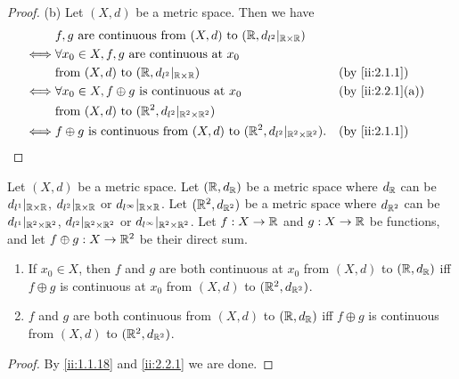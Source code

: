 \begin{proof}{(b)}
  Let \((X, d)\) be a metric space.
  Then we have
  \begin{align*}
         & f, g \text{ are continuous from } (X, d) \text{ to } (\R, d_{l^2}|_{\R \times \R})                                   \\
    \iff & \forall x_0 \in X, f, g \text{ are continuous at } x_0                                                               \\
         & \text{from } (X, d) \text{ to } (\R, d_{l^2}|_{\R \times \R})                                  &  & \by{ii:2.1.1}    \\
    \iff & \forall x_0 \in X, f \oplus g \text{ is continuous at } x_0                                    &  & \by{ii:2.2.1}[a] \\
         & \text{from } (X, d) \text{ to } (\R^2, d_{l^2}|_{\R^2 \times \R^2})                                                  \\
    \iff & f \oplus g \text{ is continuous from } (X, d) \text{ to } (\R^2, d_{l^2}|_{\R^2 \times \R^2}). &  & \by{ii:2.1.1}
  \end{align*}
\end{proof}

\begin{ac}\label{ii:ac:2.2.1}
  Let \((X, d)\) be a metric space.
  Let \((\mathbb{R}, d_{\mathbb{R}})\) be a metric space where \(d_{\mathbb{R}}\) can be \(d_{l^1}|_{\mathbb{R} \times \mathbb{R}}\), \(d_{l^2}|_{\mathbb{R} \times \mathbb{R}}\) or \(d_{l^\infty}|_{\mathbb{R} \times \mathbb{R}}\).
  Let \((\mathbb{R}^2, d_{\mathbb{R}^2})\) be a metric space where \(d_{\mathbb{R}^2}\) can be \(d_{l^1}|_{\mathbb{R}^2 \times \mathbb{R}^2}\), \(d_{l^2}|_{\mathbb{R}^2 \times \mathbb{R}^2}\) or \(d_{l^\infty}|_{\mathbb{R}^2 \times \mathbb{R}^2}\).
  Let \(f : X \to \mathbb{R}\) and \(g : X \to \mathbb{R}\) be functions, and let \(f \oplus g : X \to \mathbb{R}^2\) be their direct sum.
  \begin{enumerate}
    \item If \(x_0 \in X\), then \(f\) and \(g\) are both continuous at \(x_0\) from \((X, d)\) to \((\mathbb{R}, d_{\mathbb{R}})\) iff \(f \oplus g\) is continuous at \(x_0\) from \((X, d)\) to \((\mathbb{R}^2, d_{\mathbb{R}^2})\).
    \item \(f\) and \(g\) are both continuous from \((X, d)\) to \((\mathbb{R}, d_{\mathbb{R}})\) iff \(f \oplus g\) is continuous from \((X, d)\) to \((\mathbb{R}^2, d_{\mathbb{R}^2})\).
  \end{enumerate}
\end{ac}

\begin{proof}
  By \cref{ii:1.1.18} and \cref{ii:2.2.1} we are done.
\end{proof}

